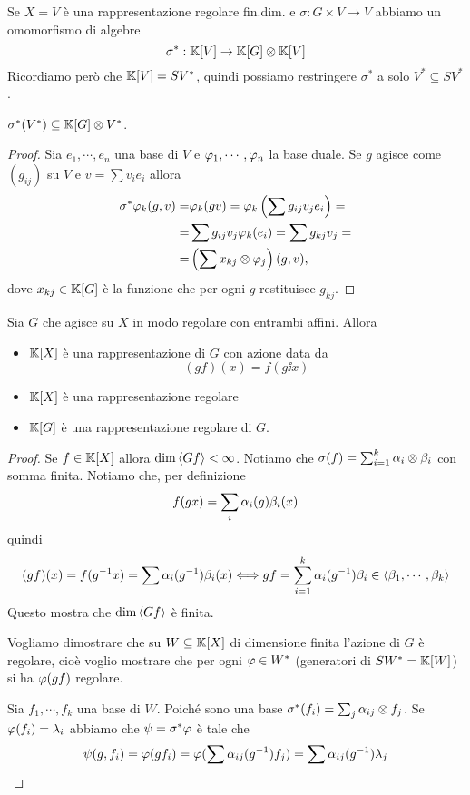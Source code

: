 \begin{remark}
Se $X=V$ \`e una rappresentazione regolare fin.dim. e $\sigma:G\times V\to V$ abbiamo un omomorfismo di algebre
\[\sigma^\ast:\mathbb{K}[V]\to \mathbb{K}[G]\otimes\mathbb{K}[V]\]
Ricordiamo per\`o che $\mathbb{K}[V]=SV^\ast$, quindi possiamo restringere $\sigma^\ast$ a solo $V^\ast\subseteq SV^\ast$.
\end{remark}

\begin{lemma}
$\sigma^\ast(V^\ast)\subseteq \mathbb{K}[G]\otimes V^\ast$.
\end{lemma}
\begin{proof}
Sia $e_1,\cdots, e_n$ una base di $V$ e $\varphi_1,\cdots, \varphi_n$ la base duale. Se $g$ agisce come $(g_{ij})$ su $V$ e $v=\sum v_ie_i$ allora
\begin{align*}
    \sigma^\ast \varphi_k(g,v)=&\varphi_k(gv)=\varphi_k\left({\sum g_{ij}v_je_i}\right)=\\
    =&\sum g_{ij}v_j\varphi_k(e_i)=\sum g_{kj}v_j=\\
    =&\left({\sum x_{kj}\otimes \varphi_j}\right)(g,v),
\end{align*}
dove $x_{kj}\in \mathbb{K}[G]$ \`e la funzione che per ogni $g$ restituisce $g_{kj}$.
\end{proof}


\begin{lemma}
Sia $G$ che agisce su $X$ in modo regolare con entrambi affini. Allora
\begin{itemize}
    \item $\mathbb{K}[X]$ \`e una rappresentazione di $G$ con azione data da
    \[(gf)(x)=f(g\ii x)\]
    \item $\mathbb{K}[X]$ \`e una rappresentazione regolare
    \item $\mathbb{K}[G]$ \`e una rappresentazione regolare di $G$.
\end{itemize}
\end{lemma}
\begin{proof}
Se $f\in \mathbb{K}[X]$ allora $\dim \left\langle {Gf}\right\rangle<\infty$. Notiamo che $\sigma(f)=\sum_{i=1}^k \alpha_i\otimes \beta_i$ con somma finita. Notiamo che, per definizione
\[f(gx)=\sum_i \alpha_i(g)\beta_i(x)\]
quindi
\[(gf)(x)=f(g^{-1} x)=\sum \alpha_i(g^{-1})\beta_i(x)\Longleftrightarrow gf=\sum_{i=1}^k \alpha_i(g^{-1})\beta_i\in \left\langle {\beta_1,\cdots,\beta_k}\right\rangle\]
Questo mostra che $\dim\left\langle {Gf}\right\rangle$ \`e finita.

Vogliamo dimostrare che su $W\subseteq \mathbb{K}[X]$ di dimensione finita l'azione di $G$ \`e regolare, cio\`e voglio mostrare che per ogni $\varphi\in W^\ast$ (generatori di $SW^\ast=\mathbb{K}[W]$) si ha $\varphi(gf)$ regolare.

Sia $f_1,\cdots, f_k$ una base di $W$. Poich\'e sono una base $\sigma^\ast(f_i)=\sum_j\alpha_{ij}\otimes f_j$. Se $\varphi(f_i)=\lambda_i$ abbiamo che $\psi=\sigma^\ast\varphi$ \`e tale che
\[\psi(g,f_i)=\varphi(gf_i)=\varphi(\sum \alpha_{ij}(g^{-1})f_j)=\sum\alpha_{ij}(g^{-1})\lambda_j\]
\end{proof}

